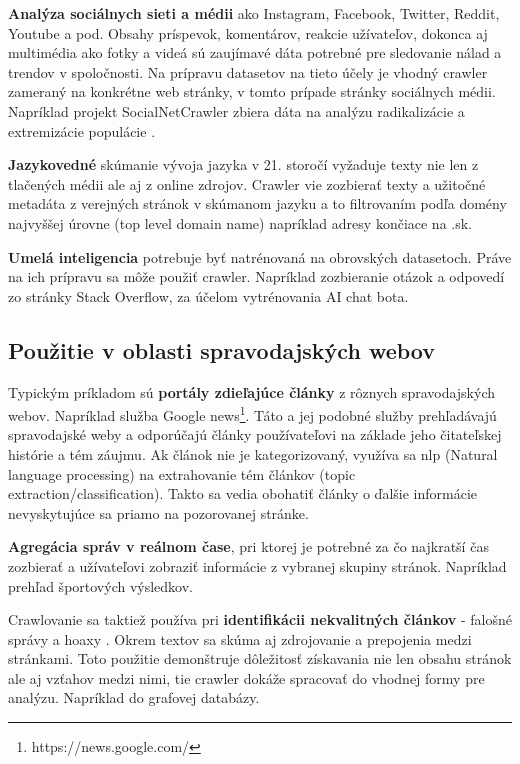 \textbf{Analýza sociálnych sieti a médii} ako Instagram, Facebook, Twitter, Reddit, Youtube a pod. Obsahy príspevok, komentárov, reakcie užívateľov, dokonca aj multimédia ako fotky a videá sú zaujímavé dáta potrebné pre sledovanie nálad a trendov v spoločnosti. Na prípravu datasetov na tieto účely je vhodný crawler zameraný na konkrétne web stránky, v tomto prípade stránky sociálnych médii. Napríklad projekt SocialNetCrawler zbiera dáta na analýzu radikalizácie a extremizácie populácie \cite{socialNetCrawler}.

\textbf{Jazykovedné} skúmanie vývoja jazyka v 21. storočí vyžaduje texty nie len z tlačených médii ale aj z online zdrojov. Crawler vie zozbierať texty a užitočné metadáta z verejných stránok v skúmanom jazyku a to filtrovaním podľa domény najvyššej úrovne (top level domain name) napríklad adresy končiace na .sk.

\textbf{Umelá inteligencia} potrebuje byť natrénovaná na obrovských datasetoch. Práve na ich prípravu sa môže použiť crawler. Napríklad zozbieranie otázok a odpovedí zo stránky Stack Overflow, za účelom vytrénovania AI chat bota. \cite{stackOverflowCrawl}

\subsection{Použitie v oblasti spravodajských webov}
Typickým príkladom sú \textbf{portály zdieľajúce články} z rôznych spravodajských webov. Napríklad služba Google news\footnote{https://news.google.com/}. Táto a jej podobné služby prehľadávajú spravodajské weby a odporúčajú články používateľovi na základe jeho čitateľskej histórie a tém záujmu. Ak článok nie je kategorizovaný, využíva sa \acrshort{nlp} (Natural language processing) na extrahovanie tém článkov (topic extraction/classification). Takto sa vedia obohatiť články o ďalšie informácie nevyskytujúce sa priamo na pozorovanej stránke.

\textbf{Agregácia správ v reálnom čase}, pri ktorej je potrebné za čo najkratší čas zozbierať a užívateľovi zobraziť informácie z vybranej skupiny stránok. Napríklad prehľad športových výsledkov. 

Crawlovanie sa taktiež používa pri \textbf{identifikácii nekvalitných článkov} - falošné správy a hoaxy \cite{fakeNews}. Okrem textov sa skúma aj zdrojovanie a prepojenia medzi stránkami. Toto použitie demonštruje dôležitosť získavania nie len obsahu stránok ale aj vzťahov medzi nimi, tie crawler dokáže spracovať do vhodnej formy pre analýzu. Napríklad do grafovej databázy. 



